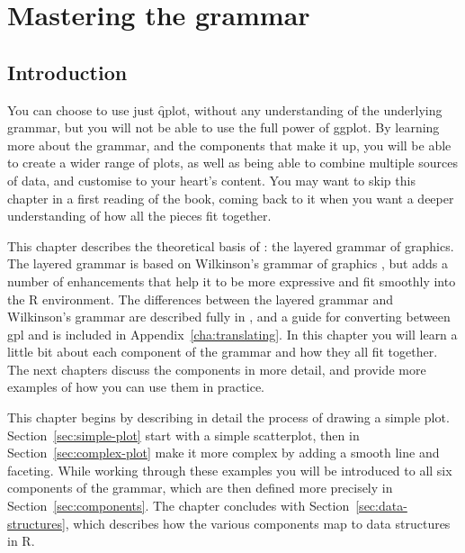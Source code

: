 

% 


\chapter{Mastering the grammar}
\label{cha:mastery}

\section{Introduction}

You can choose to use just \f{qplot}, without any understanding of the underlying grammar, but you will not be able to use the full power of ggplot.  By learning more about the grammar, and the components that make it up, you will be able to create a wider range of plots, as well as being able to combine multiple sources of data, and customise to your heart's content.  You may want to skip this chapter in a first reading of the book, coming back to it when you want a deeper understanding of how all the pieces fit together.

This chapter describes the theoretical basis of \ggplot: the layered grammar of graphics.  The layered grammar is based on Wilkinson's grammar of graphics \citep{wilkinson:2006}, but adds a number of enhancements that help it to be more expressive and fit smoothly into the R environment.  The differences between the layered grammar and Wilkinson's grammar are described fully in \citep{wickham:2008}, and a guide for converting between {\sc gpl} and \ggplot is included in Appendix~\ref{cha:translating}.  In this chapter you will learn a little bit about each component of the grammar and how they all fit together.  The next chapters discuss the components in more detail, and provide more examples of how you can use them in practice.

This chapter begins by describing in detail the process of drawing a simple plot.  Section~\ref{sec:simple-plot} start with a simple scatterplot, then in Section~\ref{sec:complex-plot} make it more complex by adding a smooth line and faceting.  While working through these examples you will be introduced to all six components of the grammar, which are then defined more precisely in Section~\ref{sec:components}.  The chapter concludes with Section~\ref{sec:data-structures}, which describes how the various components map to data structures in R.  

